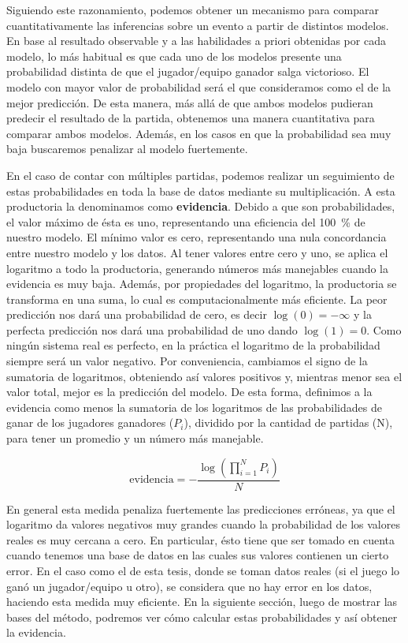 \documentclass[11pt,twoside,spanish]{report} %
\begin{document}
Siguiendo este razonamiento, podemos obtener un mecanismo para comparar cuantitativamente las inferencias sobre un evento a partir de distintos modelos.
En base al resultado observable y a las habilidades a priori obtenidas por cada modelo, lo m\'as habitual es que cada uno de los modelos presente una probabilidad distinta de que el jugador/equipo ganador salga victorioso.
El modelo con mayor valor de probabilidad ser\'a el que consideramos como el de la mejor predicci\'on. De esta manera, m\'as all\'a de que ambos modelos pudieran predecir el resultado de la partida, obtenemos una manera cuantitativa para comparar ambos modelos.
Adem\'as, en los casos en que la probabilidad sea muy baja buscaremos penalizar al modelo fuertemente.

En el caso de contar con m\'ultiples partidas, podemos realizar un seguimiento de estas probabilidades en toda la base de datos mediante su multiplicaci\'on.
A esta productoria la denominamos como \textbf{evidencia}.
Debido a que son probabilidades, el valor m\'aximo de \'esta es uno, representando una eficiencia del \SI{100}{\percent} de nuestro modelo.
El m\'inimo valor es cero, representando una nula concordancia entre nuestro modelo y los datos.
Al tener valores entre cero y uno, se aplica el logaritmo a todo la productoria, generando n\'umeros m\'as manejables cuando la evidencia es muy baja.
Adem\'as, por propiedades del logaritmo, la productoria se transforma en una suma, lo cual es computacionalmente m\'as eficiente.
La peor predicci\'on nos dar\'a una probabilidad de cero, es decir $\log(0)=-\infty$ y la perfecta predicci\'on nos dar\'a una probabilidad de uno dando $\log(1)=0$.
Como ning\'un sistema real es perfecto, en la pr\'actica el logaritmo de la probabilidad siempre ser\'a un valor negativo.
Por conveniencia, cambiamos el signo de la sumatoria de logaritmos, obteniendo as\'i valores positivos y, mientras menor sea el valor total, mejor es la predicci\'on del modelo.
De esta forma, definimos a la evidencia como menos la sumatoria de los logaritmos de las probabilidades de ganar de los jugadores ganadores ($P_i$), dividido por la cantidad de partidas (N), para tener un promedio y un n\'umero m\'as manejable.

\begin{equation}\label{eq:evidencia_usada}
	\text{evidencia} = -\frac{\log(\prod_{i=1}^{N}P_i)}{N}
\end{equation}

En general esta medida penaliza fuertemente las predicciones err\'oneas, ya que el logaritmo da valores negativos muy grandes cuando la probabilidad de los valores reales es muy cercana a cero.
En particular, \'esto tiene que ser tomado en cuenta cuando tenemos una base de datos en las cuales sus valores contienen un cierto error.
En el caso como el de esta tesis, donde se toman datos reales (si el juego lo gan\'o un jugador/equipo u otro), se considera que no hay error en los datos, haciendo esta medida muy eficiente.
En la siguiente secci\'on, luego de mostrar las bases del m\'etodo, podremos ver c\'omo calcular estas probabilidades y as\'i obtener la evidencia.
\end{document}
